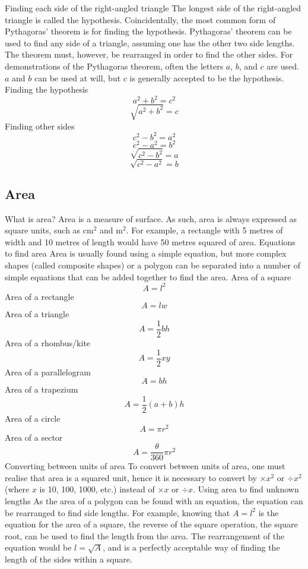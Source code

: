 \begin{outline}
\begin{center}
\end{center}
	\1 Finding each side of the right-angled triangle
		\2 The longest side of the right-angled triangle is called the hypothesis. Coincidentally, the most common form of Pythagoras' theorem is for finding the hypothesis. Pythagoras' theorem can be used to find any side of a triangle, assuming one has the other two side lengths. The theorem must, however, be rearranged in order to find the other sides. For demonstrations of the Pythagoras theorem, often the letters $a$, $b$, and $c$ are used. $a$ and $b$ can be used at will, but $c$ is generally accepted to be the hypothesis.
			\3 Finding the hypothesis
				\[a^2 + b^2 = c^2\]
				\[\sqrt{a^2 + b^2} = c\]
			\3 Finding other sides
				\[c^2 - b^2 = a^2\]
				\[c^2 - a^2 = b^2\]
				\[\sqrt{c^2 - b^2} = a\]
				\[\sqrt{c^2 - a^2} = b\]

\0
\subsection{Area}
	\1 What is area?
		\2 Area is a measure of surface. As such, area is always expressed as square units, such as cm$^2$ and m$^2$. For example, a rectangle with 5 metres of width and 10 metres of length would have 50 metres squared of area.
	\1 Equations to find area
		\2 Area is usually found using a simple equation, but more complex shapes (called composite shapes) or a polygon can be separated into a number of simple equations that can be added together to find the area.
			\3 Area of a square
				\[A = l^2\]
			\3 Area of a rectangle
				\[A = lw\]
			\3 Area of a triangle
				\[A = \frac{1}{2}bh\]
			\3 Area of a rhombus/kite
				\[A = \frac{1}{2}xy\]
			\3 Area of a parallelogram
				\[A = bh\]
			\3 Area of a trapezium
				\[A = \frac{1}{2}(a+b)h\]
			\3 Area of a circle
				\[A = \pi r^2\]
			\3 Area of a sector
				\[A = \frac{\theta}{360}\pi r^2\]
	\1 Converting between units of area
		\2 To convert between units of area, one must realise that area is a squared unit, hence it is necessary to convert by $\times x^2$ or $\div x^2$ (where $x$ is 10, 100, 1000, etc.) instead of $\times x$ or $\div x$.
	\1 Using area to find unknown lengths
		\2 As the area of a polygon can be found with an equation, the equation can be rearranged to find side lengths. For example, knowing that $A = l^2$ is the equation for the area of a square, the reverse of the square operation, the square root, can be used to find the length from the area. The rearrangement of the equation would be $l = \sqrt{A}$, and is a perfectly acceptable way of finding the length of the sides within a square.


\end{outline}
